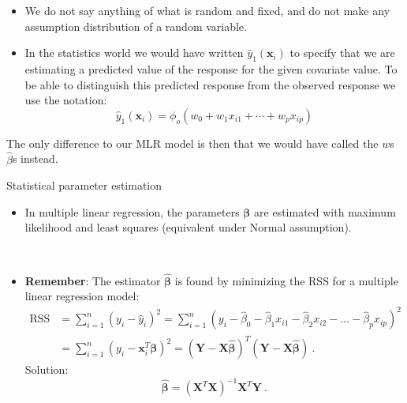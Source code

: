 \documentclass[10pt,ignorenonframetext,]{beamer}
\providecommand{\tightlist}{%
  \setlength{\itemsep}{0pt}\setlength{\parskip}{0pt}}
\begin{document}
\begin{frame}

\begin{itemize}
\item
  We do not say anything of what is random and fixed, and do not make
  any assumption distribution of a random variable.
\item
  In the statistics world we would have written
  \(\hat{y}_1({\boldsymbol x}_i)\) to specify that we are estimating a
  predicted value of the response for the given covariate value. To be
  able to distinguish this predicted response from the observed response
  we use the notation:
  \[ \hat{y}_1({\boldsymbol x}_i)=\phi_o(w_0+w_1 x_{i1}+\cdots + w_p x_{ip})\]
\end{itemize}

The only difference to our MLR model is then that we would have called
the \(w\)s \(\hat{\beta}\)s instead.

\end{frame}

\begin{frame}

\begin{block}{Statistical parameter estimation}

\vspace{2mm}

\begin{itemize}
\tightlist
\item
  In multiple linear regression, the parameters \(\boldsymbol\beta\) are
  estimated with maximum likelihood and least squares (equivalent under
  Normal assumption).
\end{itemize}

\(~\)

\begin{itemize}
\tightlist
\item
  \textbf{Remember}: The estimator \(\hat{\boldsymbol \beta}\) is found
  by minimizing the RSS for a multiple linear regression model: \[
  \begin{aligned} \text{RSS} &=\sum_{i=1}^n (y_i - \hat y_i)^2 = \sum_{i=1}^n (y_i - \hat \beta_0 - \hat \beta_1 x_{i1} - \hat \beta_2 x_{i2} -...-\hat \beta_p x_{ip} )^2 \\
  &= \sum_{i=1}^n (y_i-{\boldsymbol x}_i^T \boldsymbol \beta)^2=({\boldsymbol Y}-{\boldsymbol X}\hat{\boldsymbol{\beta}})^T({\boldsymbol Y}-{\boldsymbol X}\hat{\boldsymbol{\beta}}) \ .\end{aligned}
  \] Solution:
  \[ \hat{\boldsymbol\beta}=({\boldsymbol X}^T{\boldsymbol X})^{-1} {\boldsymbol X}^T {\boldsymbol Y} \ .\]
\end{itemize}

\end{block}

\end{frame}
\end{document}
